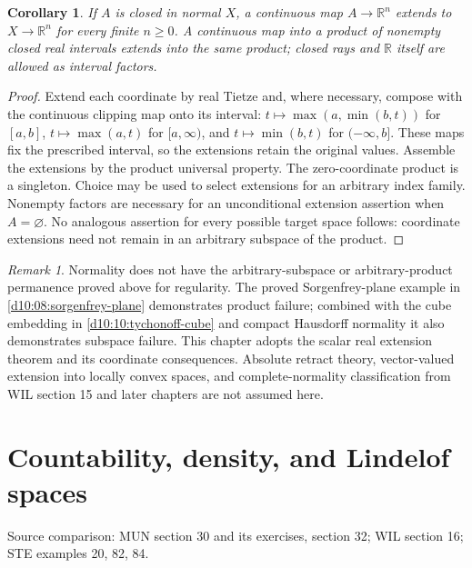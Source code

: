 \documentclass[11pt,oneside,openany]{book}
\newtheorem{corollary}[theorem]{Corollary}
\theoremstyle{definition}
\theoremstyle{remark}
\newtheorem{remark}[theorem]{Remark}
\newcommand{\R}{\mathbb R}\newcommand{\C}{\mathbb C}
\newcommand{\source}[1]{\par\begingroup\small\sffamily\color{black!65}Source comparison: #1\par\endgroup}
\begin{document}
\begin{corollary}\label{d10:07:finite-coordinate-extension}
If $A$ is closed in normal $X$, a continuous map $A\to\R^n$ extends to $X\to\R^n$ for every finite $n\geq0$. A continuous map into a product of nonempty closed real intervals extends into the same product; closed rays and $\R$ itself are allowed as interval factors.
\end{corollary}
\begin{proof}
Extend each coordinate by real Tietze and, where necessary, compose with the continuous clipping map onto its interval: $t\mapsto\max(a,\min(b,t))$ for $[a,b]$, $t\mapsto\max(a,t)$ for $[a,\infty)$, and $t\mapsto\min(b,t)$ for $(-\infty,b]$. These maps fix the prescribed interval, so the extensions retain the original values. Assemble the extensions by the product universal property. The zero-coordinate product is a singleton. Choice may be used to select extensions for an arbitrary index family. Nonempty factors are necessary for an unconditional extension assertion when $A=\varnothing$. No analogous assertion for every possible target space follows: coordinate extensions need not remain in an arbitrary subspace of the product.
\end{proof}

\begin{remark}\label{d10:07:normal-scope}
Normality does not have the arbitrary-subspace or arbitrary-product permanence proved above for regularity. The proved Sorgenfrey-plane example in \cref{d10:08:sorgenfrey-plane} demonstrates product failure; combined with the cube embedding in \cref{d10:10:tychonoff-cube} and compact Hausdorff normality it also demonstrates subspace failure. This chapter adopts the scalar real extension theorem and its coordinate consequences. Absolute retract theory, vector-valued extension into locally convex spaces, and complete-normality classification from WIL section 15 and later chapters are not assumed here.
\end{remark}



\chapter{Countability, density, and Lindelof spaces}\label{ch:d10-08}
\source{MUN section 30 and its exercises, section 32; WIL section 16; STE examples 20, 82, 84.}
\end{document}
